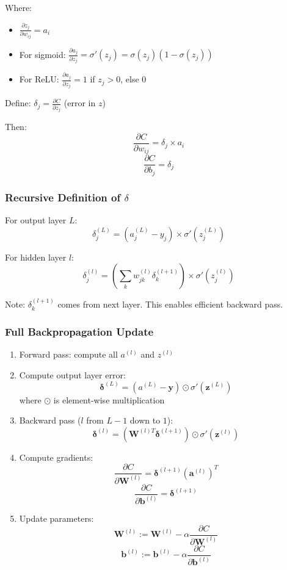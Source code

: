\documentclass[11pt,a4paper]{article}
\begin{document}
Where:
\begin{itemize}
    \item $\frac{\partial z_j}{\partial w_{ij}} = a_i$
    \item For sigmoid: $\frac{\partial a_j}{\partial z_j} = \sigma'(z_j) = \sigma(z_j)(1 - \sigma(z_j))$
    \item For ReLU: $\frac{\partial a_j}{\partial z_j} = 1$ if $z_j > 0$, else $0$
\end{itemize}

Define: $\delta_j = \frac{\partial C}{\partial z_j}$ (error in $z$)

Then:
\[
\frac{\partial C}{\partial w_{ij}} = \delta_j \times a_i
\]
\[
\frac{\partial C}{\partial b_j} = \delta_j
\]

\subsubsection{Recursive Definition of $\delta$}
For output layer $L$:
\[
\delta_j^{(L)} = (a_j^{(L)} - y_j) \times \sigma'(z_j^{(L)})
\]

For hidden layer $l$:
\[
\delta_j^{(l)} = \left(\sum_k w_{jk}^{(l)} \delta_k^{(l+1)}\right) \times \sigma'(z_j^{(l)})
\]

Note: $\delta_k^{(l+1)}$ comes from next layer. This enables efficient backward pass.

\subsubsection{Full Backpropagation Update}

\begin{enumerate}
    \item Forward pass: compute all $a^{(l)}$ and $z^{(l)}$

    \item Compute output layer error:
    \[
    \boldsymbol{\delta}^{(L)} = (a^{(L)} - \mathbf{y}) \odot \sigma'(\mathbf{z}^{(L)})
    \]
    where $\odot$ is element-wise multiplication

    \item Backward pass ($l$ from $L-1$ down to $1$):
    \[
    \boldsymbol{\delta}^{(l)} = (\mathbf{W}^{(l)T} \boldsymbol{\delta}^{(l+1)}) \odot \sigma'(\mathbf{z}^{(l)})
    \]

    \item Compute gradients:
    \[
    \frac{\partial C}{\partial \mathbf{W}^{(l)}} = \boldsymbol{\delta}^{(l+1)} (\mathbf{a}^{(l)})^T
    \]
    \[
    \frac{\partial C}{\partial \mathbf{b}^{(l)}} = \boldsymbol{\delta}^{(l+1)}
    \]

    \item Update parameters:
    \[
    \mathbf{W}^{(l)} := \mathbf{W}^{(l)} - \alpha \frac{\partial C}{\partial \mathbf{W}^{(l)}}
    \]
    \[
    \mathbf{b}^{(l)} := \mathbf{b}^{(l)} - \alpha \frac{\partial C}{\partial \mathbf{b}^{(l)}}
    \]
\end{enumerate}
\end{document}
